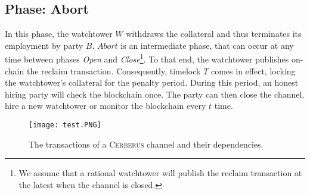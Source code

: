 \documentclass[runningheads]{llncs}
\newcommand{\sys}{\textsc{Cerberus}\xspace}
\begin{document}
\subsection{Phase: Abort}\label{subsec:abort}

In this phase, the watchtower $W$ withdraws the collateral and thus terminates its employment by party $B$.
$Abort$ is an intermediate phase, that can occur at any time between phases \textit{Open} and \textit{Close}\footnote{We assume that a rational watchtower will publish the reclaim transaction at the latest when the channel is closed.}.
To that end, the watchtower publishes on-chain the reclaim transaction. Consequently, timelock $T$ comes in effect, locking the watchtower's collateral for the penalty period. 
During this period, an honest hiring party will check the blockchain once. The party can then close the channel, hire a new watchtower or monitor the blockchain every $t$ time.

\begin{figure}
    \centering
    \texttt{[image: test.PNG]}
    \caption{The transactions of a \sys channel and their dependencies.}
    \label{fig:txs}
\end{figure}





\end{document}
